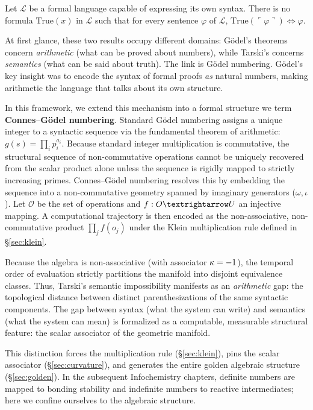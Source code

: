 \begin{theorem}\label{thm:tarski}
Let $\mathcal{L}$ be a formal language capable of expressing its own syntax. There is no formula $\mathrm{True}(x)$ in $\mathcal{L}$ such that for every sentence $\varphi$ of $\mathcal{L}$, $\mathrm{True}(\ulcorner \varphi \urcorner) \iff \varphi$.
\end{theorem}

At first glance, these two results occupy different domains: G\"odel's theorems concern \emph{arithmetic} (what can be proved about numbers), while Tarski's concerns \emph{semantics} (what can be said about truth). The link is G\"odel numbering. G\"odel's key insight was to encode the syntax of formal proofs \emph{as} natural numbers, making arithmetic the language that talks about its own structure. 

In this framework, we extend this mechanism into a formal structure we term \textbf{Connes--G\"odel numbering}. Standard G\"odel numbering assigns a unique integer to a syntactic sequence via the fundamental theorem of arithmetic: $g(s) = \prod_i p_i^{a_i}$. Because standard integer multiplication is commutative, the structural sequence of non-commutative operations cannot be uniquely recovered from the scalar product alone unless the sequence is rigidly mapped to strictly increasing primes. Connes--G\"odel numbering resolves this by embedding the sequence into a non-commutative geometry spanned by imaginary generators ($\omega, \iota$). Let $\mathcal{O}$ be the set of operations and $f: \mathcal{O} \to \UU$ an injective mapping. A computational trajectory is then encoded as the non-associative, non-commutative product $\prod_{j} f(o_j)$ under the Klein multiplication rule defined in \S\ref{sec:klein}. 

Because the algebra is non-associative (with associator $\kappa = -1$), the temporal order of evaluation strictly partitions the manifold into disjoint equivalence classes. Thus, Tarski's semantic impossibility manifests as an \emph{arithmetic} gap: the topological distance between distinct parenthesizations of the same syntactic components. The gap between syntax (what the system can write) and semantics (what the system can mean) is formalized as a computable, measurable structural feature: the scalar associator of the geometric manifold.

\medskip

This distinction forces the multiplication rule (\S\ref{sec:klein}), pins the scalar associator (\S\ref{sec:curvature}), and generates the entire golden algebraic structure (\S\ref{sec:golden}). In the subsequent Infochemistry chapters, definite numbers are mapped to bonding stability and indefinite numbers to reactive intermediates; here we confine ourselves to the algebraic structure.

